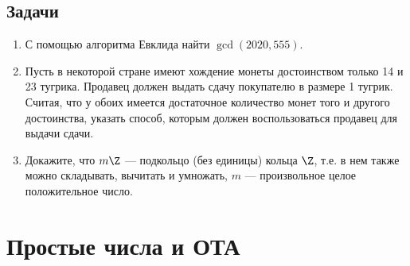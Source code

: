 \subsection*{Задачи}
\begin{enumerate}
\item С помощью алгоритма Евклида найти $\gcd(2020,555)$.
\item Пусть в некоторой стране имеют хождение монеты достоинством только 14 и 23 тугрика. Продавец должен выдать сдачу покупателю в размере 1 тугрик. Считая, что у обоих имеется достаточное количество монет того и другого достоинства, указать способ, которым должен воспользоваться продавец для выдачи сдачи.
\item Докажите, что $m\Z$ --- подкольцо (без единицы) кольца $\Z$, т.е. в нем также можно складывать, вычитать и умножать, $m$ --- произвольное целое положительное число.
\end{enumerate}


\section{Простые числа и ОТА}\label{PrimeNumbers}


